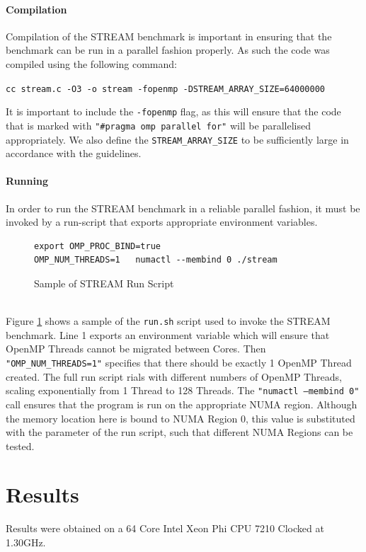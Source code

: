 \documentclass[bsc,frontabs,twoside,singlespacing,parskip,deptreport]{infthesis}     %
\begin{document}
\subsubsection{Compilation}
Compilation of the STREAM benchmark is important in ensuring that the benchmark can be run in a parallel fashion properly. As such the code was compiled using the following command:
\begin{center}
    \texttt{cc stream.c -O3 -o stream -fopenmp -DSTREAM\_ARRAY\_SIZE=64000000}
\end{center}
It is important to include the \texttt{-fopenmp} flag, as this will ensure that the code that is marked with \texttt{"\#pragma omp parallel for"} will be parallelised appropriately. We also define the \texttt{STREAM\_ARRAY\_SIZE} to be sufficiently large in accordance with the guidelines.

\subsubsection{Running}
In order to run the STREAM benchmark in a reliable parallel fashion, it must be invoked by a run-script that exports appropriate environment variables.
{
\begin{figure}[!h]
    \centering
    \begin{verbatim}
export OMP_PROC_BIND=true
OMP_NUM_THREADS=1   numactl --membind 0 ./stream 
    \end{verbatim}
    \caption{Sample of STREAM Run Script}
    \label{fig:stream-run-script}
\end{figure}
} \\

Figure \ref{fig:stream-run-script} shows a sample of the \texttt{run.sh} script used to invoke the STREAM benchmark. Line 1 exports an environment variable which will ensure that OpenMP Threads cannot be migrated between Cores. Then \texttt{"OMP\_NUM\_THREADS=1"} specifies that there should be exactly 1 OpenMP Thread created. The full run script rials with different numbers of OpenMP Threads, scaling exponentially from 1 Thread to 128 Threads. The \texttt{"numactl --membind 0"} call ensures that the program is run on the appropriate NUMA region. Although the memory location here is bound to NUMA Region 0, this value is substituted with the parameter of the run script, such that different NUMA Regions can be tested.

\newpage

\chapter{Results}\label{chap:results}
Results were obtained on a 64 Core Intel Xeon Phi CPU 7210 Clocked at 1.30GHz.
\end{document}
